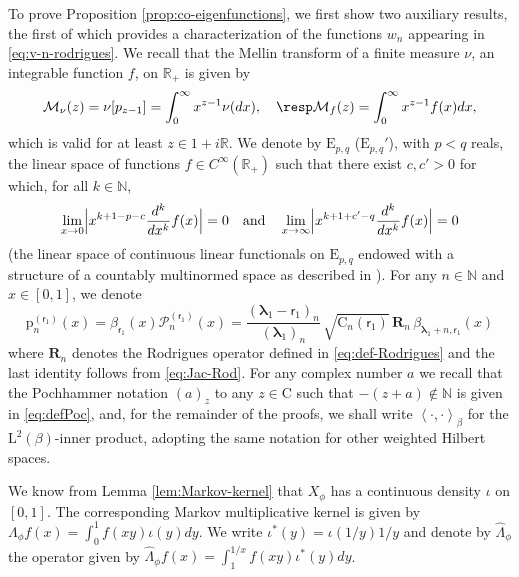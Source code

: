 \documentclass[10pt]{amsart}
\theoremstyle{plain}
\theoremstyle{definition}
\newcommand{\N}{\mathbb{N}}
\newcommand{\R}{\mathbb{R}}
\renewcommand{\P}{\mathcal{P}}
\newcommand{\calM}{\mathcal{M}}
\newcommand{\Rc}{\mathbf{R}}
\newcommand{\C}{{\mathrm{C}}}
\newcommand{\Em}{\mathrm{E}}
\newcommand{\Leb}{\mathrm{L}}
\newcommand{\pab}[1][\alpha,\beta]{\mathrm{p}^{(#1)}}
\newcommand{\lam}{{\bm{\lambda}_1}}
\newcommand{\vat}{{\mathsf{r}_1}}
\newcommand{\gab}[1][\lam,\mo]{{\beta_{#1}}}
\let\mo\mu
\let\bpsi\beta
\begin{document}
To prove Proposition \ref{prop:co-eigenfunctions}, we first show two auxiliary results, the first of which provides
a characterization of the functions $w_n$ appearing in \eqref{eq:v-n-rodrigues}.
We recall that the Mellin transform of a finite measure $\nu$, \resp an integrable function $f$, on $\R_+$ is given by
\begin{equation*}
\calM_{\nu}(z) = \nu[p_{z-1}] = \int_0^\infty x^{z-1}\nu(dx), \quad \resp \calM_{f}(z)=\int_0^\infty x^{z-1}f(x)dx,
\end{equation*}
which is valid for at least $z \in 1+i\R$. We denote by $\Em_{p,q}$ (\resp $\Em_{p,q}'$), with $p < q$ reals, the linear space of functions $f \in C^\infty(\R_+)$ such that there exist $c, c' > 0$ for which, for all $k \in \N$,
\begin{equation*}
\lim_{x\to 0} \Bigl| x^{k+1-p-c} \frac{d^k}{dx^k}f(x)\Bigr| = 0 \quad \text{and} \quad \lim_{x\to \infty} \Bigl| x^{k+1+c'-q} \frac{d^k}{dx^k}f(x)\Bigr| = 0
\end{equation*}
(\resp the linear space of continuous linear functionals on $\Em_{p,q}$ endowed with a structure of a countably multinormed space as described in \cite[p.\,231]{Misra-Lavoine}). For any $n \in \N$ and $x\in [0,1]$, we denote
\begin{equation*}
\pab[\vat]_n(x) = \gab[\vat](x) \P_n^{(\vat)}(x) = \frac{(\lam-\vat)_n}{(\lam)_n}\, \sqrt{\C_n(\vat)}\, \Rc_{n}\, \gab[\lam+n,\vat](x)
\end{equation*}
where $\Rc_{n}$ denotes the Rodrigues operator defined in \eqref{eq:def-Rodrigues} and the last identity follows from \eqref{eq:Jac-Rod}. For any complex number $a$ we recall that the Pochhammer notation $(a)_z$ to any $z \in \C$ such that $-(z+a) \notin \N$ is given in \eqref{eq:defPoc}, and, for the remainder of the proofs, we shall write $\left\langle \cdot{,}\cdot \right\rangle_{\bpsi}$ for the $\Leb^2(\bpsi)$-inner product, adopting the same notation for other weighted Hilbert spaces.

We know from Lemma \ref{lem:Markov-kernel} that $X_{\phi}$ has a continuous density $\iota$ on $[0,1]$.
The corresponding Markov multiplicative kernel is given by $\Lambda_{\phi} f(x) = \int_0^1 f(xy) \iota(y)dy$.
We write $\iota^*(y)=\iota(1/y)1/y$ and denote by $\hat{\Lambda}_{\phi}$ the operator given by
$\widehat{\Lambda}_{\phi} f(x) = \int_1^{1/x}f(xy)\iota^*(y)dy$.
\end{document}
